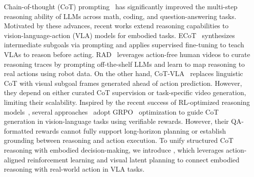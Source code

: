 Chain-of-thought (CoT) prompting~\cite{wei2022chain,wang2024chain,yeo2025demystifying} has significantly improved the multi-step reasoning ability of LLMs across math, coding, and question-answering tasks. Motivated by these advances, recent works extend reasoning capabilities to vision-language-action (VLA) models for embodied tasks.
ECoT~\cite{zawalski2024robotic} synthesizes intermediate subgoals via prompting and applies supervised fine-tuning to teach VLAs to reason before acting. RAD~\cite{clark2025action} leverages action-free human videos to curate reasoning traces by prompting off-the-shelf LLMs and learn to map reasoning to real actions using robot data. On the other hand, CoT-VLA~\cite{zhao2025cot} replaces linguistic CoT with visual subgoal frames generated ahead of action prediction. However, they depend on either curated CoT supervision or task-specific video generation, limiting their scalability. Inspired by the recent success of RL-optimized reasoning models~\cite{shao2024deepseekmath,guo2025deepseek}, several approaches~\cite{feng2025video,nvidia2025cosmosreason1physicalcommonsense,tan2025reason,liu2025visual} adopt GRPO~\cite{shao2024deepseekmath} optimization to guide CoT generation in vision-language tasks using verifiable rewards. However, their QA-formatted rewards cannot fully support long-horizon planning or establish grounding between reasoning and action execution. To unify structured CoT reasoning with embodied decision-making, we introduce \ours{}, which leverages action-aligned reinforcement learning and visual latent planning to connect embodied reasoning with real-world action in VLA tasks.